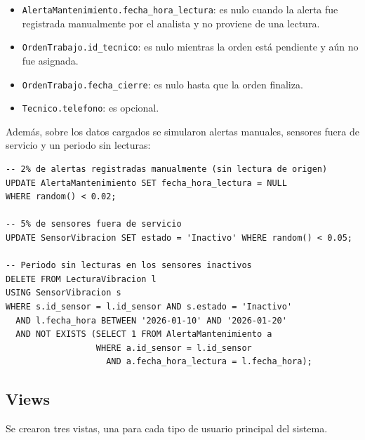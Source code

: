 \documentclass[11pt,a4paper]{article}
\begin{document}
\begin{itemize}
    \item \texttt{AlertaMantenimiento.fecha\_hora\_lectura}: es nulo cuando la
    alerta fue registrada manualmente por el analista y no proviene de una
    lectura.
    \item \texttt{OrdenTrabajo.id\_tecnico}: es nulo mientras la orden está
    pendiente y aún no fue asignada.
    \item \texttt{OrdenTrabajo.fecha\_cierre}: es nulo hasta que la orden
    finaliza.
    \item \texttt{Tecnico.telefono}: es opcional.
\end{itemize}

Además, sobre los datos cargados se simularon alertas manuales, sensores fuera
de servicio y un periodo sin lecturas:

\begin{lstlisting}
-- 2% de alertas registradas manualmente (sin lectura de origen)
UPDATE AlertaMantenimiento SET fecha_hora_lectura = NULL
WHERE random() < 0.02;

-- 5% de sensores fuera de servicio
UPDATE SensorVibracion SET estado = 'Inactivo' WHERE random() < 0.05;

-- Periodo sin lecturas en los sensores inactivos
DELETE FROM LecturaVibracion l
USING SensorVibracion s
WHERE s.id_sensor = l.id_sensor AND s.estado = 'Inactivo'
  AND l.fecha_hora BETWEEN '2026-01-10' AND '2026-01-20'
  AND NOT EXISTS (SELECT 1 FROM AlertaMantenimiento a
                  WHERE a.id_sensor = l.id_sensor
                    AND a.fecha_hora_lectura = l.fecha_hora);
\end{lstlisting}

\subsection{Views}

Se crearon tres vistas, una para cada tipo de usuario principal del sistema.
\end{document}
